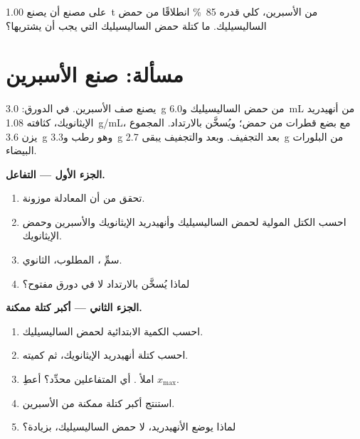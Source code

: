 \begin{exercise}[$\star\star\star$]\label{exo:g10:synthesis-yield:15}
على مصنع أن يصنع \qty{1.00}{t} من الأسبرين،  كلي قدره
\qty{85}{\percent} انطلاقًا من حمض الساليسيليك. ما كتلة حمض الساليسيليك التي
يجب أن يشتريها؟
\end{exercise}

\section{مسألة: صنع الأسبرين}

\begin{problem}
\label{pb:g10:synthesis-yield:1}
يصنع صف الأسبرين. في الدورق: \qty{3.0}{g} من حمض الساليسيليك
و\qty{6.0}{mL} من أنهيدريد الإيثانويك، كثافته \qty{1.08}{g/mL}، مع بضع
قطرات من حمض؛ ويُسخَّن  بالارتداد.  المجموع  يزن \qty{3.6}{g} وهو رطب و\qty{3.3}{g} بعد التجفيف. وبعد  والتجفيف يبقى \qty{2.7}{g} من البلورات
البيضاء.

\medskip
\noindent\textbf{الجزء الأول --- التفاعل.}
\begin{enumerate}
  \item تحقق من أن المعادلة
         موزونة.
  \item احسب الكتل المولية لحمض الساليسيليك وأنهيدريد الإيثانويك
        والأسبرين وحمض الإيثانويك.
  \item سمِّ ،  المطلوب،  الثانوي.
  \item لماذا يُسخَّن  بالارتداد لا في دورق
        مفتوح؟
\end{enumerate}

\medskip
\noindent\textbf{الجزء الثاني --- أكبر كتلة ممكنة.}
\begin{enumerate}[resume]
  \item احسب الكمية الابتدائية لحمض الساليسيليك.
  \item احسب كتلة أنهيدريد الإيثانويك، ثم كميته.
  \item املأ . أي المتفاعلين محدِّد؟ أعطِ
        $x_{\max}$.
  \item استنتج أكبر كتلة ممكنة من الأسبرين.
  \item لماذا يوضع الأنهيدريد، لا حمض الساليسيليك،
        بزيادة؟
\end{enumerate}


\end{problem}
